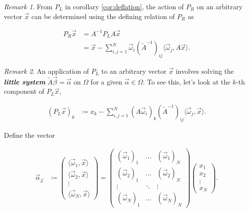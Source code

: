 \documentclass{article}
\theoremstyle{plain} %
\theoremstyle{convention} %
\theoremstyle{remark} %
\newtheorem*{remark}{Remark} %
\def\df#1{\textbf{\textit{#1}}}
\numberwithin{equation}{section}
\begin{document}
\begin{remark}
From $P_L$ in corollary \ref{cor:deflation}, the action of $P_R$ on an arbitrary vector $\vec{x}$ can be determined using the defining relation of $P_R$ as

\begin{align*}
    P_R\vec{x} &= A^{-1} P_L A \vec{x} \\ 
    &= \vec{x} - \sum_{i,j=1}^N \vec{\omega}_i (\widetilde{A}^{-1})_{ij} \langle \vec{\omega}_j, A \vec{x} \rangle.
\end{align*}
\end{remark}

\begin{remark}
An application of $P_L$ to an arbitrary vector $\vec{x}$ involves solving the \df{little system} $\widetilde{A} \vec{\beta} = \vec{\alpha}$ on $\Omega$ for a given $\vec{\alpha} \in \Omega$. To see this, let's look at the $k$-th component of $P_L \vec{x}$,

\begin{align*}
    (P_L\vec{x})_k &\coloneqq x_k - \sum_{i,j=1}^N (A\vec{\omega}_i)_k (\widetilde{A}^{-1})_{ij} \langle \vec{\omega}_j, \vec{x} \rangle.
\end{align*}

Define the vector

\begin{align*}
    \vec{\alpha}_{\vec{x}} &\coloneqq
    \begin{pmatrix}
        \langle \vec{\omega}_1, \vec{x} \rangle \\
        \langle \vec{\omega}_2, \vec{x} \rangle \\
        \vdots \\
        \langle \vec{\omega}_N, \vec{x} \rangle
    \end{pmatrix} = \begin{pmatrix}
        (\vec{\omega}_1)_1 & \hdots & (\vec{\omega}_1)_N \\
        (\vec{\omega}_2)_1 & \hdots & (\vec{\omega}_2)_N \\
        \vdots & \ddots & \vdots \\
        (\vec{\omega}_N)_1 & \hdots & (\vec{\omega}_N)_N
    \end{pmatrix} \begin{pmatrix}
        x_1 \\
        x_2 \\
        \vdots \\
        x_N
    \end{pmatrix}.
\end{align*}


\end{remark}
\end{document}

